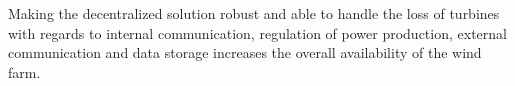 Making the decentralized solution robust and able to handle the loss of turbines with regards to internal communication, regulation of power production, external communication and data storage increases the overall availability of the wind farm. %

\clearpage